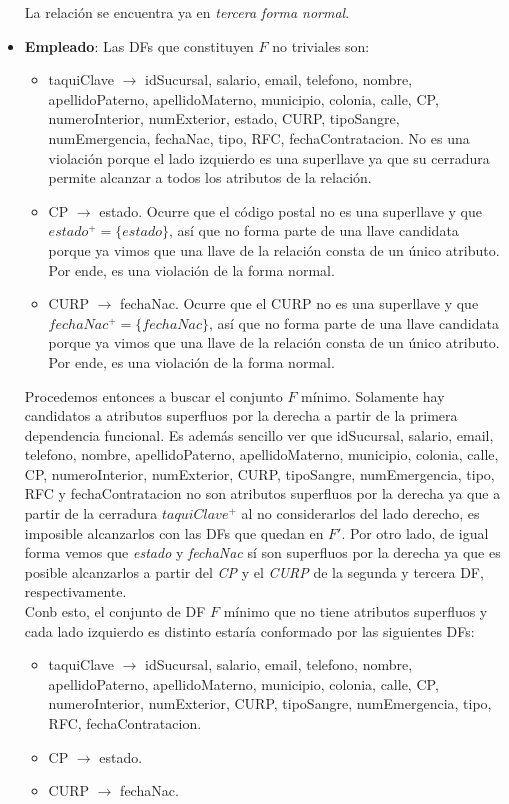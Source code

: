 \documentclass[11pt,letterpaper]{article}
\begin{document}
\begin{itemize}
La relación se encuentra ya en \textit{tercera forma normal}.


\item \textbf{Empleado}: Las DFs que constituyen $F$ no triviales son:

\begin{itemize}
\item taquiClave $\rightarrow$ idSucursal, salario, email, telefono, nombre, apellidoPaterno, apellidoMaterno,  municipio, colonia, calle, CP, numeroInterior, numExterior, estado, CURP, tipoSangre, numEmergencia, fechaNac, tipo, RFC, fechaContratacion. No es una violación porque el lado izquierdo es una superllave ya que su cerradura permite alcanzar a todos los atributos de la relación.
\item CP $\rightarrow$ estado. Ocurre que el código postal no es una superllave y que $estado^+=\{estado\}$, así que no forma parte de una llave candidata porque ya vimos que una llave de la relación consta de un único atributo. Por ende, es una violación de la forma normal.
\item CURP $\rightarrow$ fechaNac. Ocurre que el CURP no es una superllave y que $fechaNac^+=\{fechaNac\}$, así que no forma parte de una llave candidata porque ya vimos que una llave de la relación consta de un único atributo. Por ende, es una violación de la forma normal.
\end{itemize} 

Procedemos entonces a buscar el conjunto $F$ mínimo. Solamente hay candidatos a atributos superfluos por la derecha a partir de la primera dependencia funcional. Es además sencillo ver que idSucursal, salario, email, telefono, nombre, apellidoPaterno, apellidoMaterno,  municipio, colonia, calle, CP, numeroInterior, numExterior, CURP, tipoSangre, numEmergencia, tipo, RFC y fechaContratacion no son atributos superfluos por la derecha ya que a partir de la cerradura $taquiClave^+$ al no considerarlos del lado derecho, es imposible alcanzarlos con las DFs que quedan en $F'$. Por otro lado, de igual forma vemos que \textit{estado} y \textit{fechaNac} sí son superfluos por la derecha ya que es posible alcanzarlos a partir del \textit{CP} y el \textit{CURP} de la segunda y tercera DF, respectivamente.\\

Conb esto, el conjunto de DF $F$ mínimo que no tiene atributos superfluos y cada lado izquierdo es distinto estaría conformado por las siguientes DFs:

\begin{itemize}
\item taquiClave $\rightarrow$ idSucursal, salario, email, telefono, nombre, apellidoPaterno, apellidoMaterno,  municipio, colonia, calle, CP, numeroInterior, numExterior, CURP, tipoSangre, numEmergencia, tipo, RFC, fechaContratacion. 
\item CP $\rightarrow$ estado.
\item CURP $\rightarrow$ fechaNac.
\end{itemize} 


\end{itemize}
\end{document}
